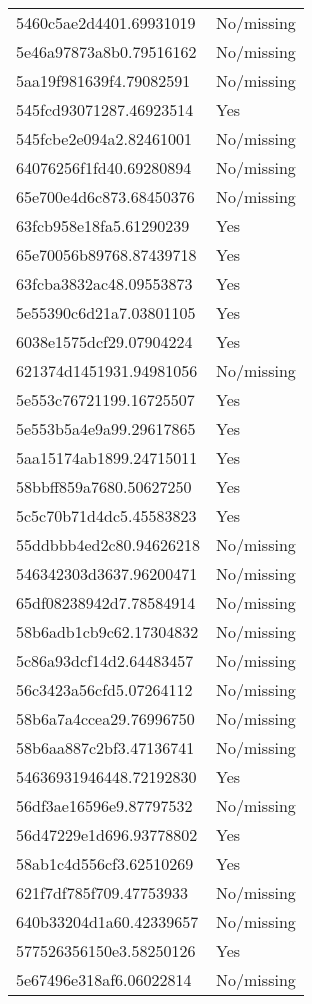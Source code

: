 \begin{tabular}{ll}
5460c5ae2d4401.69931019 & No/missing \\
5e46a97873a8b0.79516162 & No/missing \\
5aa19f981639f4.79082591 & No/missing \\
545fcd93071287.46923514 & Yes \\
545fcbe2e094a2.82461001 & No/missing \\
64076256f1fd40.69280894 & No/missing \\
65e700e4d6c873.68450376 & No/missing \\
63fcb958e18fa5.61290239 & Yes \\
65e70056b89768.87439718 & Yes \\
63fcba3832ac48.09553873 & Yes \\
5e55390c6d21a7.03801105 & Yes \\
6038e1575dcf29.07904224 & Yes \\
621374d1451931.94981056 & No/missing \\
5e553c76721199.16725507 & Yes \\
5e553b5a4e9a99.29617865 & Yes \\
5aa15174ab1899.24715011 & Yes \\
58bbff859a7680.50627250 & Yes \\
5c5c70b71d4dc5.45583823 & Yes \\
55ddbbb4ed2c80.94626218 & No/missing \\
546342303d3637.96200471 & No/missing \\
65df08238942d7.78584914 & No/missing \\
58b6adb1cb9c62.17304832 & No/missing \\
5c86a93dcf14d2.64483457 & No/missing \\
56c3423a56cfd5.07264112 & No/missing \\
58b6a7a4ccea29.76996750 & No/missing \\
58b6aa887c2bf3.47136741 & No/missing \\
54636931946448.72192830 & Yes \\
56df3ae16596e9.87797532 & No/missing \\
56d47229e1d696.93778802 & Yes \\
58ab1c4d556cf3.62510269 & Yes \\
621f7df785f709.47753933 & No/missing \\
640b33204d1a60.42339657 & No/missing \\
577526356150e3.58250126 & Yes \\
5e67496e318af6.06022814 & No/missing \\

\end{tabular}
